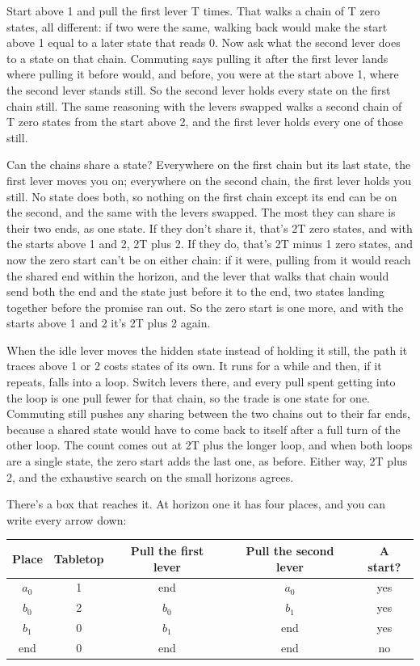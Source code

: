 \documentclass[11pt,twoside]{article}
\theoremstyle{thielethm}
\theoremstyle{thieledef}
\theoremstyle{thieledef}
\theoremstyle{thieledef}
\theoremstyle{thielethm}
\theoremstyle{thieleobs}
\theoremstyle{thielethm}
\begin{document}
Start above 1 and pull the first lever T times. That walks a chain of T zero states, all different: if two were the same, walking back would make the start above 1 equal to a later state that reads 0. Now ask what the second lever does to a state on that chain. Commuting says pulling it after the first lever lands where pulling it before would, and before, you were at the start above 1, where the second lever stands still. So the second lever holds every state on the first chain still. The same reasoning with the levers swapped walks a second chain of T zero states from the start above 2, and the first lever holds every one of those still.

Can the chains share a state? Everywhere on the first chain but its last state, the first lever moves you on; everywhere on the second chain, the first lever holds you still. No state does both, so nothing on the first chain except its end can be on the second, and the same with the levers swapped. The most they can share is their two ends, as one state. If they don't share it, that's 2T zero states, and with the starts above 1 and 2, 2T plus 2. If they do, that's 2T minus 1 zero states, and now the zero start can't be on either chain: if it were, pulling from it would reach the shared end within the horizon, and the lever that walks that chain would send both the end and the state just before it to the end, two states landing together before the promise ran out. So the zero start is one more, and with the starts above 1 and 2 it's 2T plus 2 again.

When the idle lever moves the hidden state instead of holding it still, the path it traces above 1 or 2 costs states of its own. It runs for a while and then, if it repeats, falls into a loop. Switch levers there, and every pull spent getting into the loop is one pull fewer for that chain, so the trade is one state for one. Commuting still pushes any sharing between the two chains out to their far ends, because a shared state would have to come back to itself after a full turn of the other loop. The count comes out at 2T plus the longer loop, and when both loops are a single state, the zero start adds the last one, as before. Either way, 2T plus 2, and the exhaustive search on the small horizons agrees.

There's a box that reaches it. At horizon one it has four places, and you can write every arrow down:

\begin{center}
\small
\begin{tabular}{@{}ccccc@{}}
Place & Tabletop & Pull the first lever & Pull the second lever & A start? \\ \hline
$a_0$ & 1 & end & $a_0$ & yes \\
$b_0$ & 2 & $b_0$ & $b_1$ & yes \\
$b_1$ & 0 & $b_1$ & end & yes \\
end & 0 & end & end & no \\ \hline
\end{tabular}
\end{center}
\end{document}

